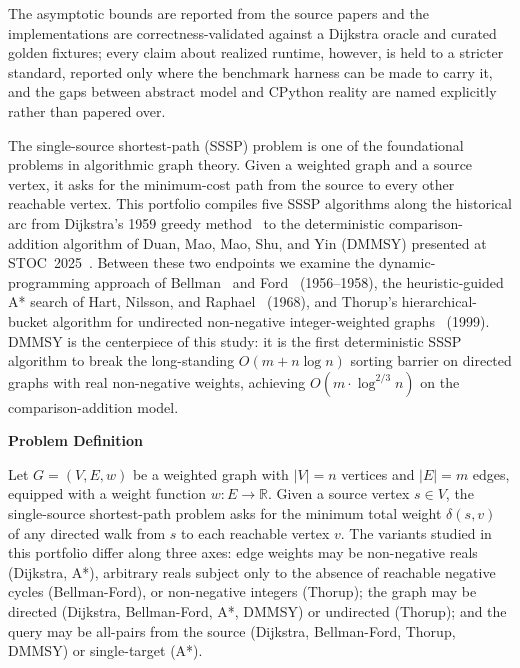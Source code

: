 \documentclass[12pt]{article}
\begin{document}
The asymptotic bounds are reported from the source papers and the implementations are correctness-validated against a Dijkstra oracle and curated golden fixtures; every claim about realized runtime, however, is held to a stricter standard, reported only where the benchmark harness can be made to carry it, and the gaps between abstract model and CPython reality are named explicitly rather than papered over.

\newpage
The single-source shortest-path (SSSP) problem is one of the foundational problems in algorithmic graph theory. Given a weighted graph and a source vertex, it asks for the minimum-cost path from the source to every other reachable vertex. This portfolio compiles five SSSP algorithms along the historical arc from Dijkstra's 1959 greedy method~\cite{dijkstra1959note} to the deterministic comparison-addition algorithm of Duan, Mao, Mao, Shu, and Yin (DMMSY) presented at STOC~2025~\cite{duan2025breaking}. Between these two endpoints we examine the dynamic-programming approach of Bellman~\cite{bellman1958routing} and Ford~\cite{ford1956network} (1956--1958), the heuristic-guided A* search of Hart, Nilsson, and Raphael~\cite{hart1968astar} (1968), and Thorup's hierarchical-bucket algorithm for undirected non-negative integer-weighted graphs~\cite{thorup1999linear} (1999). DMMSY is the centerpiece of this study: it is the first deterministic SSSP algorithm to break the long-standing $O(m + n \log n)$ sorting barrier on directed graphs with real non-negative weights, achieving $O\!\left(m \cdot \log^{2/3} n\right)$ on the comparison-addition model.

\medskip
\noindent\textbf{Problem Definition}\label{sec:problem-definition}
\medskip

Let $G = (V, E, w)$ be a weighted graph with $|V| = n$ vertices and $|E| = m$ edges, equipped with a weight function $w : E \rightarrow \mathbb{R}$. Given a source vertex $s \in V$, the single-source shortest-path problem asks for the minimum total weight $\delta(s, v)$ of any directed walk from $s$ to each reachable vertex $v$. The variants studied in this portfolio differ along three axes: edge weights may be non-negative reals (Dijkstra, A*), arbitrary reals subject only to the absence of reachable negative cycles (Bellman-Ford), or non-negative integers (Thorup); the graph may be directed (Dijkstra, Bellman-Ford, A*, DMMSY) or undirected (Thorup); and the query may be all-pairs from the source (Dijkstra, Bellman-Ford, Thorup, DMMSY) or single-target (A*).
\end{document}
